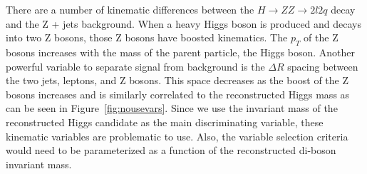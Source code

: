 There are a number of kinematic differences between the $H \rightarrow ZZ \rightarrow 2l2q$ decay and the Z + jets background.  When a heavy Higgs boson is produced and decays into two Z bosons, those Z bosons have boosted kinematics.  The $p_T$ of the Z bosons increases with the mass of the parent particle, the Higgs boson.  Another powerful variable to separate signal from background is the $\Delta R$ spacing between the two jets, leptons, and Z bosons.  This space decreases as the boost of the Z bosons increases and is similarly correlated to the reconstructed Higgs mass as can be seen in Figure~\ref{fig:nousevars}.  Since we use the invariant mass of the reconstructed Higgs candidate as the main discriminating variable, these kinematic variables are problematic to use. Also, the variable selection criteria would need to be parameterized as a function of the reconstructed di-boson invariant mass.

